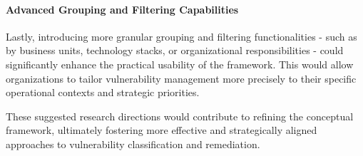 \paragraph{Advanced Grouping and Filtering Capabilities}
Lastly, introducing more granular grouping and filtering functionalities - such as by business units, technology stacks, or organizational responsibilities - could significantly enhance the practical usability of the framework. This would allow organizations to tailor vulnerability management more precisely to their specific operational contexts and strategic priorities.

These suggested research directions would contribute to refining the conceptual framework, ultimately fostering more effective and strategically aligned approaches to vulnerability classification and remediation.